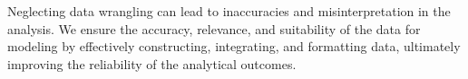Neglecting data wrangling can lead to inaccuracies and misinterpretation in the analysis. We ensure the accuracy, relevance, and suitability of the data for modeling by effectively constructing, integrating, and formatting data, ultimately improving the reliability of the analytical outcomes.


















